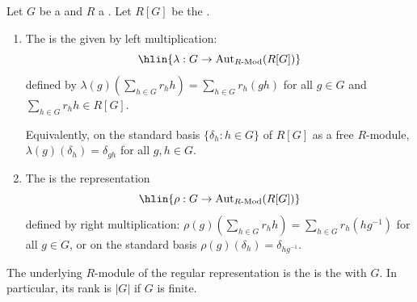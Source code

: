 \begin{definition} \label{definition:regular_representation_of_a_group_over_a_ring}
Let $G$ be a  and $R$ a . Let $R[G]$ be the .

\begin{enumerate}
    \item 
    The  is the  given by left multiplication:
    $$
    \hlin{\lambda : G \to \mathrm{Aut}_{R\text{-}\mathrm{Mod}}(R[G])}
    $$
    defined by $\lambda(g)(\sum_{h \in G} r_h h) = \sum_{h \in G} r_h (gh)$ for all $g \in G$ and $\sum_{h \in G} r_h h \in R[G]$.

    Equivalently, on the standard basis $\{\delta_h : h \in G\}$ of $R[G]$ as a free $R$-module, $\lambda(g)(\delta_h) = \delta_{gh}$ for all $g, h \in G$.

    \item The  is the representation
    $$
    \hlin{\rho : G \to \mathrm{Aut}_{R\text{-}\mathrm{Mod}}(R[G])}
    $$
    defined by right multiplication: $\rho(g)(\sum_{h \in G} r_h h) = \sum_{h \in G} r_h (hg^{-1})$ for all $g \in G$, or on the standard basis $\rho(g)(\delta_h) = \delta_{hg^{-1}}$.

\end{enumerate}
The underlying $R$-module of the regular representation is the is the  with  $G$. In particular, its rank is $|G|$ if $G$ is finite.
\end{definition}